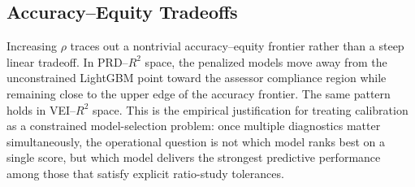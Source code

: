 \documentclass[12pt]{article}
\theoremstyle{plain}
\theoremstyle{definition}
\newcommand{\1}{\mathbf{1}}
\begin{document}


\subsection{Accuracy--Equity Tradeoffs}

Increasing $\rho$ traces out a nontrivial accuracy--equity frontier rather than a steep linear tradeoff. In PRD--$R^2$ space, the penalized models move away from the unconstrained LightGBM point toward the assessor compliance region while remaining close to the upper edge of the accuracy frontier. The same pattern holds in VEI--$R^2$ space. This is the empirical justification for treating calibration as a constrained model-selection problem: once multiple diagnostics matter simultaneously, the operational question is not which model ranks best on a single score, but which model delivers the strongest predictive performance among those that satisfy explicit ratio-study tolerances.
\end{document}
